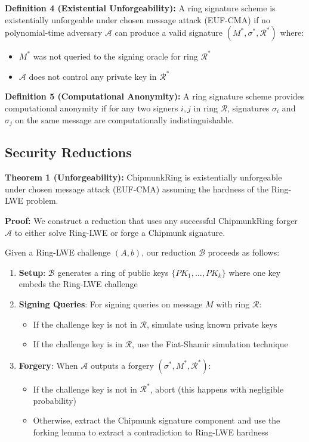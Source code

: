 \documentclass[11pt,a4paper]{article}
\begin{document}
\textbf{Definition 4 (Existential Unforgeability):} A ring signature scheme is existentially unforgeable under chosen message attack (EUF-CMA) if no polynomial-time adversary $\mathcal{A}$ can produce a valid signature $(M^*, \sigma^*, \mathcal{R}^*)$ where:
\begin{itemize}
\item $M^*$ was not queried to the signing oracle for ring $\mathcal{R}^*$
\item $\mathcal{A}$ does not control any private key in $\mathcal{R}^*$
\end{itemize}

\textbf{Definition 5 (Computational Anonymity):} A ring signature scheme provides computational anonymity if for any two signers $i, j$ in ring $\mathcal{R}$, signatures $\sigma_i$ and $\sigma_j$ on the same message are computationally indistinguishable.

\subsection{Security Reductions}

\textbf{Theorem 1 (Unforgeability):} ChipmunkRing is existentially unforgeable under chosen message attack (EUF-CMA) assuming the hardness of the Ring-LWE problem.

\textbf{Proof:} We construct a reduction that uses any successful ChipmunkRing forger $\mathcal{A}$ to either solve Ring-LWE or forge a Chipmunk signature.

Given a Ring-LWE challenge $(A, b)$, our reduction $\mathcal{B}$ proceeds as follows:
\begin{enumerate}
\item \textbf{Setup}: $\mathcal{B}$ generates a ring of public keys $\{PK_1, \ldots, PK_k\}$ where one key embeds the Ring-LWE challenge
\item \textbf{Signing Queries}: For signing queries on message $M$ with ring $\mathcal{R}$:
   \begin{itemize}
   \item If the challenge key is not in $\mathcal{R}$, simulate using known private keys
   \item If the challenge key is in $\mathcal{R}$, use the Fiat-Shamir simulation technique
   \end{itemize}
\item \textbf{Forgery}: When $\mathcal{A}$ outputs a forgery $(\sigma^*, M^*, \mathcal{R}^*)$:
   \begin{itemize}
   \item If the challenge key is not in $\mathcal{R}^*$, abort (this happens with negligible probability)
   \item Otherwise, extract the Chipmunk signature component and use the forking lemma to extract a contradiction to Ring-LWE hardness
   \end{itemize}
\end{enumerate}
\end{document}
